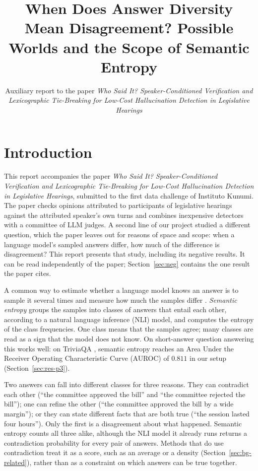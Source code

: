\documentclass[english]{desafiokunumi}
\title{When Does Answer Diversity Mean Disagreement? Possible Worlds and the Scope of Semantic Entropy}
\subtitle{{\normalsize\mdseries Auxiliary report to the paper \emph{Who Said It? Speaker-Conditioned Verification and Lexicographic Tie-Breaking for Low-Cost Hallucination Detection in Legislative Hearings}}}
\theoremstyle{definition}
\theoremstyle{remark}
\begin{document}
\raggedbottom
\maketitle

\section{Introduction}
\label{sec:intro}

This report accompanies the paper \emph{Who Said It? Speaker-Conditioned
Verification and Lexicographic Tie-Breaking for Low-Cost Hallucination
Detection in Legislative Hearings}, submitted to the first data challenge of
Instituto Kunumi. The paper checks opinions attributed to participants of
legislative hearings against the attributed speaker's own turns and combines
inexpensive detectors with a committee of LLM judges. A second line of our
project studied a different question, which the paper leaves out for reasons
of space and scope: when a language model's sampled answers differ, how much of
the difference is disagreement? This report presents that study, including
its negative results. It can be read independently of the paper;
Section~\ref{sec:neg} contains the one result the paper cites.

A common way to estimate whether a language model knows an answer is to sample
it several times and measure how much the samples differ
\citep{manakul2023selfcheckgpt,kuhn2023semantic}. \emph{Semantic entropy}
\citep{kuhn2023semantic,farquhar2024semantic} groups the samples into classes
of answers that entail each other, according to a natural language inference
(NLI) model, and computes the entropy of the class frequencies. One class means
that the samples agree; many classes are read as a sign that the model does not
know. On short-answer question answering this works well: on TriviaQA
\citep{joshi2017triviaqa}, semantic entropy reaches an Area Under the Receiver Operating Characteristic Curve (AUROC) of $0.811$ in our
setup (Section~\ref{sec:res-p3}).

Two answers can fall into different classes for three reasons. They can
contradict each other (``the committee approved the bill'' and ``the committee
rejected the bill''); one can refine the other (``the committee approved the
bill by a wide margin''); or they can state different facts that are both true
(``the session lasted four hours''). Only the first is a disagreement about
what happened. Semantic entropy counts all three alike, although the NLI model
it already runs returns a contradiction probability for every pair of answers.
Methods that do use contradiction treat it as a score, such as an average or a
density (Section~\ref{sec:bg-related}), rather than as a constraint on which
answers can be true together.
\end{document}
